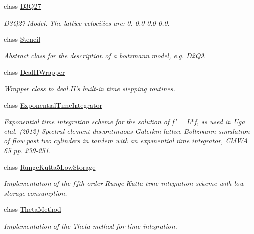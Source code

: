 \begin{DoxyCompactItemize}
class \hyperlink{classnatrium_1_1D3Q27}{D3Q27}
\begin{DoxyCompactList}\small\item\em \hyperlink{classnatrium_1_1D3Q27}{D3Q27} Model. The lattice velocities are: 0. 0.0 0.0 0.0. \item\end{DoxyCompactList}\item 
class \hyperlink{classnatrium_1_1Stencil}{Stencil}
\begin{DoxyCompactList}\small\item\em Abstract class for the description of a boltzmann model, e.g. \hyperlink{classnatrium_1_1D2Q9}{D2Q9}. \item\end{DoxyCompactList}\item 
class \hyperlink{classnatrium_1_1DealIIWrapper}{DealIIWrapper}
\begin{DoxyCompactList}\small\item\em Wrapper class to deal.II's built-\/in time stepping routines. \item\end{DoxyCompactList}\item 
class \hyperlink{classnatrium_1_1ExponentialTimeIntegrator}{ExponentialTimeIntegrator}
\begin{DoxyCompactList}\small\item\em Exponential time integration scheme for the solution of f' = L$\ast$f, as used in Uga etal. (2012) Spectral-\/element discontinuous Galerkin lattice Boltzmann simulation of flow past two cylinders in tandem with an exponential time integrator, CMWA 65 pp. 239-\/251. \item\end{DoxyCompactList}\item 
class \hyperlink{classnatrium_1_1RungeKutta5LowStorage}{RungeKutta5LowStorage}
\begin{DoxyCompactList}\small\item\em Implementation of the fifth-\/order Runge-\/Kutta time integration scheme with low storage consumption. \item\end{DoxyCompactList}\item 
class \hyperlink{classnatrium_1_1ThetaMethod}{ThetaMethod}
\begin{DoxyCompactList}\small\item\em Implementation of the Theta method for time integration. \item\end{DoxyCompactList}\item 

\end{DoxyCompactItemize}
